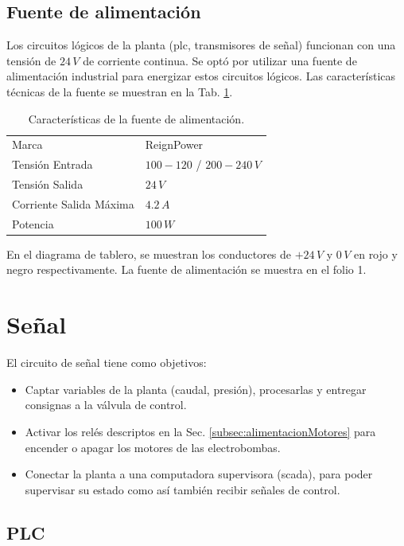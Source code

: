 \subsection{Fuente de alimentación}
\label{subsec:fuenteAlim}
Los circuitos lógicos de la planta (\gls{plc}, transmisores de señal) funcionan con una
tensión de $24\,V$ de corriente continua.
Se optó por utilizar una fuente de alimentación industrial para energizar estos
circuitos lógicos.
Las características técnicas de la fuente se muestran en la Tab.
\ref{tab:fuenteAlim}.
\begin{table}[h]
\renewcommand{\arraystretch}{1.3}
\centering
\begin{tabular}{|l|l|}
\hline
Marca & ReignPower\\
Tensión Entrada& $100-120$ / $200-240\,V$\\
Tensión Salida& $24\,V$\\
Corriente Salida Máxima& $4.2\,A$\\
Potencia & $100\,W$\\
\hline
\end{tabular}
\caption{Características de la fuente de alimentación.}
\label{tab:fuenteAlim}
\end{table}

En el diagrama de tablero, se muestran los conductores de $+24\,V$ y $0\,V$ en
rojo y negro respectivamente.
La fuente de alimentación se muestra en el folio 1.

\section{Señal}
\label{sec:Senal}

El circuito de señal tiene como objetivos:
\begin{itemize}
 \item Captar variables de la planta (caudal, presión), procesarlas y entregar
consignas a la válvula de control.
\item Activar los relés descriptos en la Sec.
\ref{subsec:alimentacionMotores} para encender o apagar los motores de las
electrobombas.
\item Conectar la planta a una computadora supervisora (\gls{scada}), para poder
supervisar su estado como así también recibir señales de control.
\end{itemize}

\subsection{PLC}
\label{subsec:plc}

